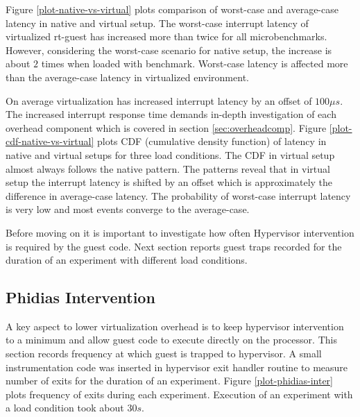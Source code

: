 


Figure \ref{plot-native-vs-virtual} plots comparison of worst-case and average-case latency in native and virtual setup.
The worst-case interrupt latency of virtualized rt-guest has increased more than twice for all microbenchmarks.
However, considering the worst-case scenario for native setup, the increase is about $2$ times when loaded with \mcachepressure{} benchmark.
Worst-case latency is affected more than the average-case latency in virtualized environment.

On average virtualization has increased interrupt latency by an offset of $100\mu{}s$.
The increased interrupt response time demands in-depth investigation of each overhead component which is covered in section \ref{sec:overheadcomp}.
Figure \ref{plot-cdf-native-vs-virtual} plots CDF (cumulative density function) of latency in native and virtual setups for three load conditions.
The CDF in virtual setup almost always follows the native pattern.
The patterns reveal that in virtual setup the interrupt latency is shifted by an offset which is approximately the difference in average-case latency.
The probability of worst-case interrupt latency is very low and most events converge to the average-case.



Before moving on it is important to investigate how often Hypervisor intervention is required by the guest code.
Next section reports guest traps recorded for the duration of an experiment with different load conditions.


\subsection{Phidias Intervention}
A key aspect to lower virtualization overhead is to keep hypervisor intervention to a minimum and allow guest code to execute directly on the processor.
This section records frequency at which guest is trapped to hypervisor.
A small instrumentation code was inserted in hypervisor exit handler routine to measure number of exits for the duration of an experiment. 
Figure \ref{plot-phidias-inter} plots frequency of exits during each experiment. 
Execution of an experiment with a load condition took about $30s$.



